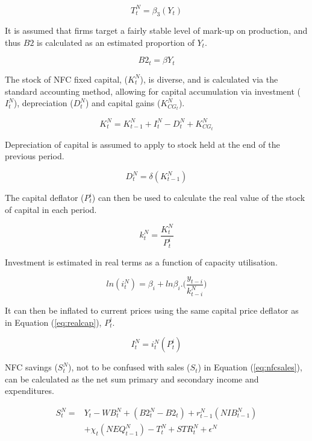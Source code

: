 \documentclass[
]{book}
\begin{document}
\begin{equation}
T^N_t = \beta _3(Y_t)
\end{equation}

It is assumed that firms target a fairly stable level of mark-up on production,
and thus \(B2\) is calculated as an estimated proportion of \(Y_t\).

\begin{equation}
B2_t = \beta Y_t
\end{equation}

The stock of NFC fixed capital, (\(K^N_t\)), is diverse, and is calculated via the
standard accounting method, allowing for capital accumulation via investment (\(I^N_t\)),
depreciation (\(D^N_t\)) and capital gains (\(K^N_{CG_t}\)).

\begin{equation}
K^N_t = K^N_{t-1} + I^N_t - D^N_t + K^N_{CG_t}
\end{equation}

Depreciation of capital is assumed to apply to stock held at the end of the previous
period.

\begin{equation}
D^N_t = \delta (K^N_{t-1})
\end{equation}

The capital deflator (\(P^i_t\)) can then be used to calculate the real
value of the stock of capital in each period.

\begin{equation}
k^N_t = \frac{K^N_t}{P^i_t}
\label{eq:realcap}
\end{equation}

Investment is estimated in real terms as a function of capacity utilisation.

\begin{equation}
ln(i^N_t) = \beta _i + ln\beta _i. \Bigg( \frac{y_{t-i}}{k^N_{t-i}}\Bigg)
\end{equation}

It can then be inflated to current prices using the same capital price deflator as in Equation (\ref{eq:realcap}), \(P^i_t\).

\begin{equation}
I^N_t = i^N_t(P^i_t)
\end{equation}

NFC savings (\(S^N_t\)), not to be confused with sales (\(S_t\)) in Equation (\ref{eq:nfcsales}),
can be calculated as the net sum primary and secondary income and expenditures.

\begin{equation}
\begin{split}
S^N_t = & Y_t - WB^N_t + (B2^N_{t} - B2_{t}) + r^N_{t-1}(NIB^N_{t-1})\\
        & + \chi _t (NEQ^N_{t-1}) - T^N_t + STR^N_t + \epsilon ^N
\end{split}
\end{equation}
\end{document}
